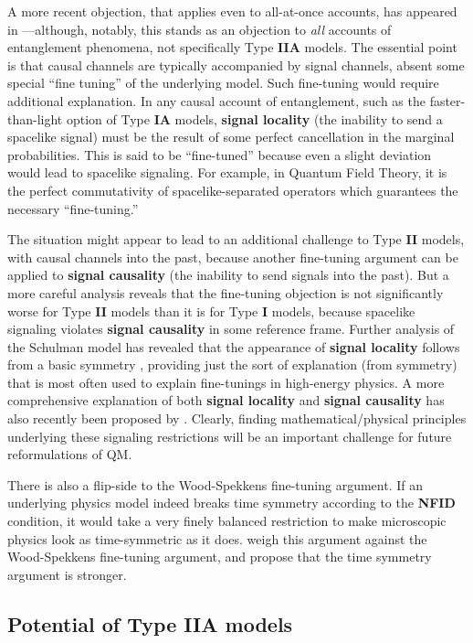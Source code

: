 \documentclass[onecolumn, nofootinbib, 12pt]{revtex4-1}
\begin{document}
A more recent objection, that applies even to all-at-once accounts, has appeared in \textcite{wood2015}---although, notably, this stands as an objection to {\em all} accounts of entanglement phenomena, not specifically Type {\bf IIA} models.  The essential point is that causal channels are typically accompanied by signal channels, absent some special ``fine tuning'' of the underlying model.  Such fine-tuning would require additional explanation.  In any causal account of entanglement, such as the faster-than-light option of Type {\bf IA} models, {\bf signal locality} (the inability to send a spacelike signal) must be the result of some perfect cancellation in the marginal probabilities.  This is said to be ``fine-tuned'' because even a slight deviation would lead to spacelike signaling.  For example, in Quantum Field Theory, it is the perfect commutativity of spacelike-separated operators which guarantees the necessary ``fine-tuning.''

The situation might appear to lead to an additional challenge to Type {\bf II} models, with causal channels into the past, because another fine-tuning argument can be applied to {\bf signal causality} (the inability to send signals into the past).  But a more careful analysis reveals that the fine-tuning objection is not significantly worse for Type {\bf II} models than it is for Type {\bf I} models, because spacelike signaling violates {\bf signal causality} in some reference frame.  Further analysis of the Schulman model has revealed that the appearance of {\bf signal locality} follows from a basic symmetry \cite{almada2016}, providing just the sort of explanation (from symmetry) that is most often used to explain fine-tunings in high-energy physics.  A more comprehensive explanation of both {\bf signal locality} and {\bf signal causality} has also recently been proposed by \textcite{adlam2018a}.  Clearly, finding mathematical/physical principles underlying these signaling restrictions will be an important challenge for future reformulations of QM.

There is also a flip-side to the Wood-Spekkens fine-tuning argument.  If an underlying physics model indeed breaks time symmetry according to the {\bf NFID} condition, it would take a very finely balanced restriction to make microscopic physics look as time-symmetric as it does.  \textcite{leifer2017a} weigh this argument against the Wood-Spekkens fine-tuning argument, and propose that the time symmetry argument is stronger.

\subsection{Potential of Type {\bf IIA} models}
\label{sec:discussionII}
\end{document}
